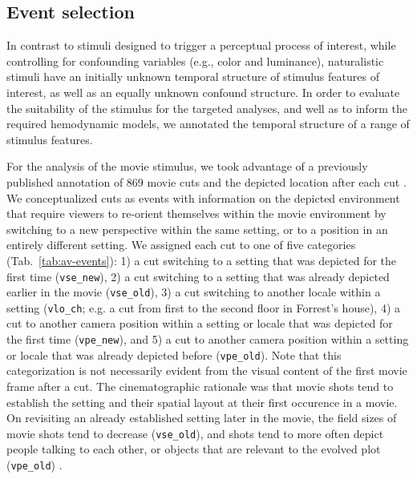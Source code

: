 \documentclass[english]{article}
\begin{document}
\subsection{Event selection} \label{rationale}

In contrast to stimuli designed to trigger a perceptual process of interest,
while controlling for confounding variables (e.g., color and luminance),
naturalistic stimuli have an initially unknown temporal structure
of stimulus features of interest, as well as an equally unknown confound structure.
In order to evaluate the suitability of the stimulus for the targeted analyses,
and well as to inform the required hemodynamic models, we annotated the temporal
structure of a range of stimulus features.

For the analysis of the movie stimulus, we took advantage of a previously
published annotation of 869 movie cuts and the depicted location after each cut
\citep{haeusler2016cutanno}.
We conceptualized cuts as events with information on the depicted environment
that require viewers to re-orient themselves within the movie environment by
switching to a new perspective within the same setting, or to a position in an
entirely different setting.
We assigned each cut to one of five categories (Tab.~\ref{tab:av-events}):
%
1) a cut switching to a setting that was depicted for the first time
(\texttt{vse\_new}),
%
2) a cut switching to a setting that was already depicted earlier in the movie
(\texttt{vse\_old}),
%
3) a cut switching to another locale within a setting (\texttt{vlo\_ch}; e.g. a
cut from first to the second floor in Forrest's house),
%
4) a cut to another camera position within a setting or locale that was depicted
for the first time (\texttt{vpe\_new}), and
%
5) a cut to another camera position within a setting or locale that was already
depicted before (\texttt{vpe\_old}).
Note that this categorization is not necessarily evident from the visual content
of the first movie frame after a cut.
The cinematographic rationale was that movie shots tend to establish the setting
and their spatial layout at their first occurence in a movie.
On revisiting an already established setting later in the movie, the field sizes
of movie shots tend to decrease (\texttt{vse\_old}), and shots tend to
more often depict people talking to each other, or objects that are relevant to
the evolved plot (\texttt{vpe\_old}) \citep{brown2012cinematography,
katz1991film, mascelli1998five}.
\end{document}
